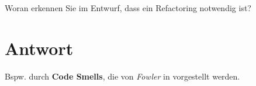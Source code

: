 Woran erkennen Sie im Entwurf, dass ein Refactoring notwendig ist?


\section*{Antwort}

Bspw. durch \textbf{Code Smells}, die von \textit{Fowler} in \cite{Fow99} vorgestellt werden.